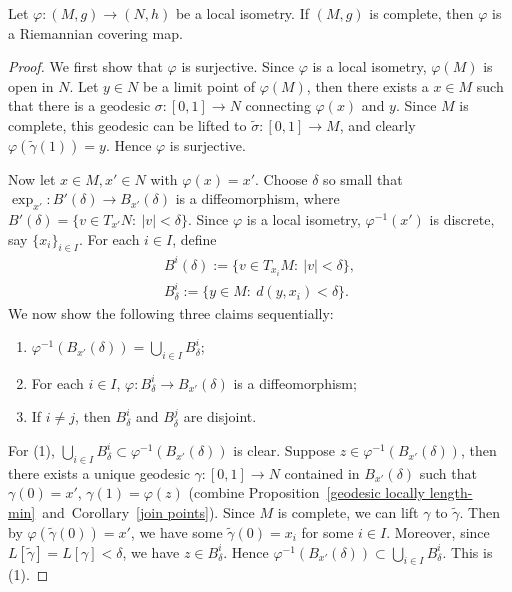 \begin{lem}[Ambrose]\label{Ambrose}
    Let $\varphi:(M,g)\to(N,h)$ be a local isometry.
    If $(M,g)$ is complete, then $\varphi$ is a Riemannian covering map.
\end{lem}
\begin{proof}
    We first show that $\varphi$ is surjective.
    Since $\varphi$ is a local isometry, $\varphi(M)$ is open in $N$.
    Let $y\in N$ be a limit point of $\varphi(M)$, then there exists a $x\in M$ such that there is a geodesic $\sigma:[0,1]\to N$ connecting $\varphi(x)$ and $y$.
    Since $M$ is complete, this geodesic can be lifted to $\tilde\sigma:[0,1]\to M$, and clearly $\varphi(\tilde\gamma(1))=y$.
    Hence $\varphi$ is surjective.

    Now let $x\in M,x'\in N$ with $\varphi(x)=x'$.
    Choose $\delta$ so small that $\exp_{x'}:B'(\delta)\to B_{x'}(\delta)$ is a diffeomorphism, where $B'(\delta)=\{v\in T_{x'}N:\ |v|<\delta\}$.
    Since $\varphi$ is a local isometry, $\varphi^{-1}(x')$ is discrete, say $\{x_i\}_{i\in I}$.
    For each $i\in I$, define
    \begin{gather*}
        B^i(\delta):=\{v\in T_{x_i}M:\ |v|<\delta\},\\
        B^i_\delta:=\{y\in M:\ d(y,x_i)<\delta\}.
    \end{gather*}
    We now show the following three claims sequentially:
    \begin{enumerate}[(1)]
        \item $\varphi^{-1}(B_{x'}(\delta))=\bigcup_{i\in I}B^i_\delta$;
        \item For each $i\in I$, $\varphi:B^i_\delta\to B_{x'}(\delta)$ is a diffeomorphism;
        \item If $i\neq j$, then $B^i_\delta$ and $B^j_\delta$ are disjoint.
    \end{enumerate}

    For (1), $\bigcup_{i\in I}B^i_\delta\subset\varphi^{-1}(B_{x'}(\delta))$ is clear.
    Suppose $z\in\varphi^{-1}(B_{x'}(\delta))$, then there exists a unique geodesic $\gamma:[0,1]\to N$ contained in $B_{x'}(\delta)$ such that $\gamma(0)=x'$, $\gamma(1)=\varphi(z)$ (combine Proposition~\ref{geodesic locally length-min}~and~Corollary~\ref{join points}).
    Since $M$ is complete, we can lift $\gamma$ to $\tilde\gamma$.
    Then by $\varphi(\tilde\gamma(0))=x'$, we have some $\tilde\gamma(0)=x_i$ for some $i\in I$.
    Moreover, since $L[\tilde\gamma]=L[\gamma]<\delta$, we have $z\in B^i_\delta$.
    Hence $\varphi^{-1}(B_{x'}(\delta))\subset\bigcup_{i\in I}B^i_\delta$.
    This is (1).


\end{proof}
